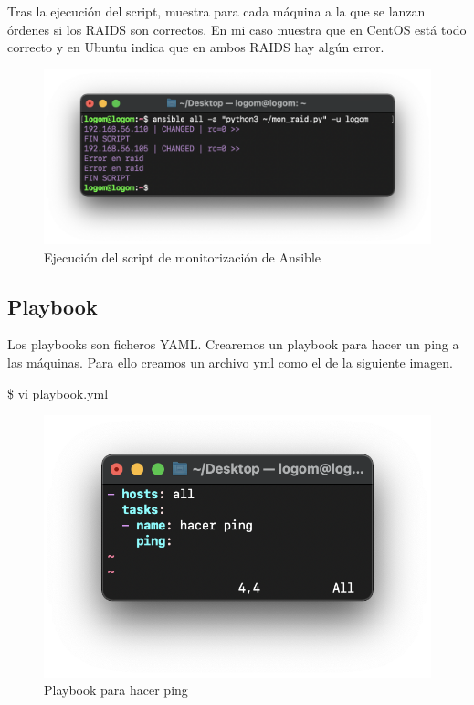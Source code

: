 Tras la ejecución del script, muestra para cada máquina a la que se lanzan órdenes si los RAIDS son correctos. En mi caso muestra que en CentOS está
todo correcto y en Ubuntu indica que en ambos RAIDS hay algún error.
    \begin{figure}[H]
        \centering
        \includegraphics[scale=0.7]{images/ejecucion_script.png}
        \caption{Ejecución del script de monitorización de Ansible}
        \label{fig:ejecucion_script}
    \end{figure}

\subsection{Playbook}
Los playbooks son ficheros YAML. Crearemos un playbook para hacer un ping a las máquinas. Para ello creamos un archivo
yml como el de la siguiente imagen.
    \begin{tcolorbox}[colback=black!10, halign=left]
        \$ vi playbook.yml
    \end{tcolorbox}

    \begin{figure}[H]
        \centering
        \includegraphics[scale=0.8]{images/playbook.png}
        \caption{Playbook para hacer ping}
        \label{fig:playbook}
    \end{figure}


